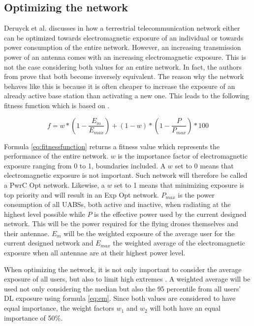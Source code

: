 \documentclass[twocolumn]{phdsymp} %
\begin{document}
\subsection{Optimizing the network}
Deruyck et al. discusses in \cite{J1} how a terrestrial  telecommunication network either can be optimized towards electromagnetic 
exposure of an individual or towards power consumption of the entire network. 
However, an increasing transmission power of an antenna comes with an increasing electromagnetic exposure. This is not the case considering
both values for an entire network. In fact, the authors from \cite{J1}  prove that both become inversely equivalent.
The reason why the network behaves like this is because it is often cheaper to increase the exposure of an already active base station 
than activating a new one. 
This leads to the following fitness function which is based on \cite{J1}.

\begin{equation} 
f = w * \left(1 - \frac{E_m}{E_{max}}\right) + (1 - w)*\left(1 - \frac{P}{P_{max}}\right) * 100
\label{eq:fitnessfunction}
\end{equation}

Formula \ref{eq:fitnessfunction} returns a fitness value which represents the performance of the entire network. 
$w$ is the importance factor of electromagnetic exposure ranging from 0 to 1, boundaries included. A $w$ set to 0 means that electromagnetic 
exposure is not important. Such network will therefore be called a \gls{PwrC Opt} network. 
Likewise, a $w$ set to 1 means that minimizing exposure is top priority and will result in an \gls{Exp Opt} network. $P_{max}$ is the power consumption of all UABSs, 
both active and inactive, when radiating at the highest level possible 
while $P$ is the effective power used by the current designed network. 
This will be the power required for the flying drones themselves and their antennae.
$E_m$ will be the weighted exposure of the average user for the current designed network and $E_{max}$ the weighted average of the electromagnetic exposure when all antennae 
are at their highest power level.

When optimizing the network, it is not only important to consider the average exposure of all users, but also to limit high extremes \cite{J1}. A weighted average 
will be used not only considering the median but also the 95 percentile from all users' \gls{DL} exposure using formula \ref{eq:em}. 
Since both values are considered to have equal importance, the weight factors $w_1$ and $w_2$ will both have an equal importance of 50\%. 
\end{document}
